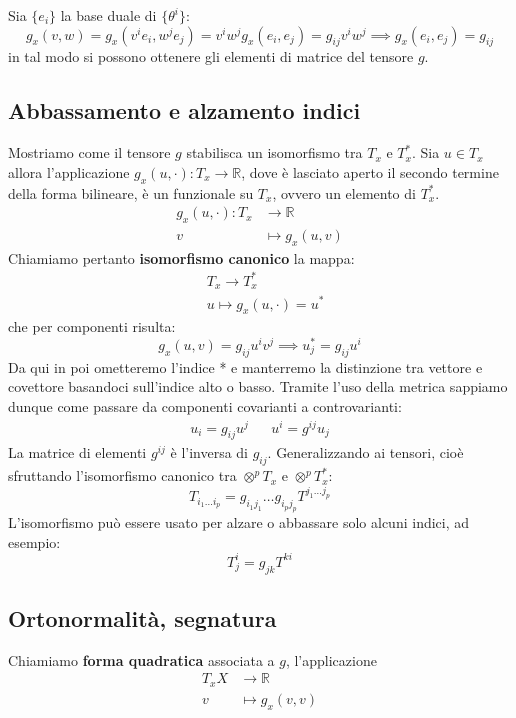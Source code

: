 Sia $\{e_i\}$ la base duale di $\{\theta^i\}$:
\begin{equation*}
    g_x(v,w) = g_x(v^i e_i,w^j e_j) = v^i w^j g_x(e_i, e_j) = g_{ij} v^i w^j \implies g_x(e_i, e_j)=g_{ij}
\end{equation*}
in tal modo si possono ottenere gli elementi di matrice del tensore $g$.

\subsection{Abbassamento e alzamento indici}
Mostriamo come il tensore $g$ stabilisca un isomorfismo tra $T_x$ e $T_x^*$. Sia $u \in T_x$ allora l'applicazione $g_x(u,\cdot): T_x \rightarrow \mathbb{R}$, dove è lasciato aperto il secondo termine della forma bilineare, è un funzionale su $T_x$, ovvero un elemento di $T_x^*$.
\begin{align*}
    g_x(u,\cdot) : T_x  &\rightarrow \mathbb{R} \\
                v &\mapsto g_x(u,v)
\end{align*}
Chiamiamo pertanto \textbf{isomorfismo canonico} la mappa:
\begin{align*}
    &T_x \rightarrow T_x^* \\
    &u \mapsto g_x(u,\cdot)= u^*
\end{align*}
che per componenti risulta:
\begin{equation*}
    g_x(u,v)=g_{ij} u^iv^j \implies u^*_j = g_{ij}u^i
\end{equation*}
Da qui in poi ometteremo l'indice * e manterremo la distinzione tra vettore e covettore basandoci sull'indice alto o basso. Tramite l'uso della metrica sappiamo dunque come passare da componenti covarianti a controvarianti:
\begin{align*}
    u_i=g_{ij}u^j && u^i=g^{ij}u_j
\end{align*}
La matrice di elementi $g^{ij}$ è l'inversa di $g_{ij}$. Generalizzando ai tensori, cioè sfruttando l'isomorfismo canonico tra $\otimes^pT_x$ e $\otimes^pT_x^*$:
\begin{equation*}
    T_{i_1\dots i_p} = g_{i_1 j_1} \dots g_{i_p j_p} T^{j_1 \dots j_p}
\end{equation*}
L'isomorfismo può essere usato per alzare o abbassare solo alcuni indici, ad esempio:
\begin{equation*}
    T^i_j= g_{jk}T^{ki}
\end{equation*}

\subsection{Ortonormalità, segnatura}
\begin{definizione}
Chiamiamo \textbf{forma quadratica} associata a $g$, l'applicazione
\begin{align*}
    T_xX & \rightarrow \mathbb{R} \\
    v &\mapsto g_x(v, v)
\end{align*}
\end{definizione}

